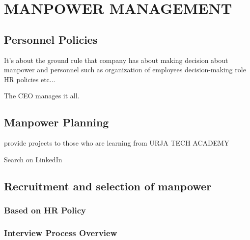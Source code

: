 
\chapter{MANPOWER MANAGEMENT}

\section{Personnel Policies}
It's about the ground rule that company has about making decision about manpower and personnel such as organization of employees decision-making role HR policies etc...

The CEO manages it all.
\section{Manpower Planning}
provide projects to those who are learning from URJA TECH ACADEMY

Search on LinkedIn
\section{Recruitment and selection of manpower}
\subsection{Based on HR Policy}

\subsection{Interview Process Overview}

